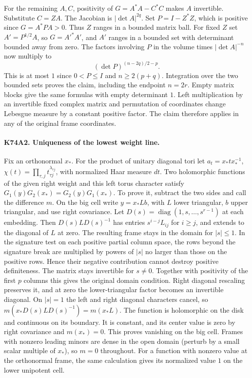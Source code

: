For the remaining $A,C$, positivity of $G=A^*A-C^*C$ makes $A$
invertible. Substitute $C=ZA$. The Jacobian is $|\det A|^{2q}$.
Set $P=I-Z^*Z$, which is positive since $G=A^*PA>0$. Thus $Z$
ranges in a bounded matrix ball. For fixed $Z$ set
$A'=P^{1/2}A$, so $G=A'^*A'$, and $A'$ ranges in a bounded set
with determinant bounded away from zero. The factors involving $P$
in the volume times $|\det A|^{-n}$ now multiply to
\[
                 (\det P)^{(n-2q)/2-p}.
\]
This is at most $1$ since $0<P\le I$ and $n\ge2(p+q)$. Integration
over the two bounded sets proves the claim, including the endpoint
$n=2r$. Empty matrix blocks give the same formulas with empty
determinant $1$. Left multiplication by an invertible fixed complex
matrix and permutation of coordinates change Lebesgue measure by a
constant positive factor. The claim therefore applies in any of the
original frame coordinates.

\paragraph{K74A2. Uniqueness of the lowest weight line.}
Fix an orthonormal $x_*$. For the product of unitary diagonal tori
let $a_t=x_*t x_*^{-1}$, $\chi(t)=\prod_{\tau,j}t_{\tau j}^{
\lambda_{\tau j}}$, with normalized Haar measure $dt$.
Two holomorphic functions of the given right weight and this left
torus character satisfy $G_1(y)G_2(x_*)=G_2(y)G_1(x_*)$. To prove
it, subtract the two sides and call the difference $m$. On the big
cell write $y=x_*Lb$, with $L$ lower triangular, $b$ upper triangular,
and use right covariance. Let
$D(s)=\operatorname{diag}(1,s,\ldots,s^{r-1})$ at each embedding.
Then $D(s)LD(s)^{-1}$ has entries $s^{i-j}L_{ij}$ for $i\ge j$,
and extends to the diagonal of $L$ at zero. The resulting frame
stays in the domain for $|s|\le1$. In the signature test on each
positive partial column space, the rows beyond the signature break
are multiplied by powers of $|s|$ no larger than those on the
positive rows. Hence their negative contribution cannot destroy
positive definiteness. The matrix stays invertible for $s\ne0$. Together
with positivity of the first $p$ columns this gives the original
domain condition. Right diagonal rescaling preserves it, and at zero
the lower-triangular factor becomes an invertible diagonal. On $|s|=1$ the left and right diagonal
characters cancel, so $m(x_*D(s)LD(s)^{-1})=m(x_*L)$.
The function is holomorphic on the disk and continuous on its
boundary. It is constant, and its center value is zero by right
covariance and $m(x_*)=0$. This proves vanishing on the big cell.
Frames with nonzero leading minors are dense in the open domain
(perturb by a small scalar multiple of $x_*$), so $m=0$ throughout.
For a function with nonzero value at the orthonormal frame, the
same calculation gives its normalized value $1$ on the lower
unipotent cell.

